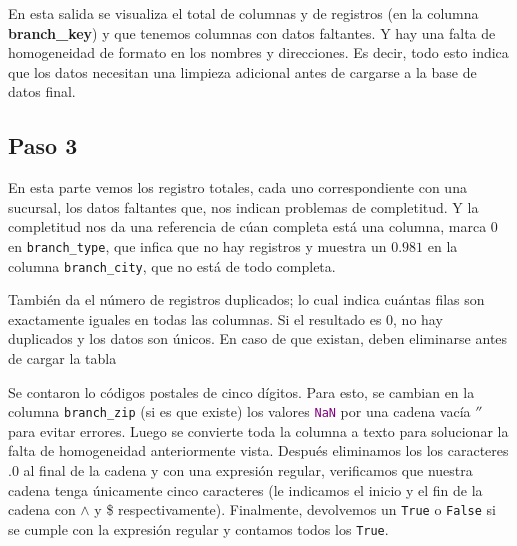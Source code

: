\vspace{0.5 cm}

En esta salida se visualiza el total de columnas y de registros 
(en la columna \textbf{branch\_key}) y que tenemos columnas con 
datos faltantes. Y hay una falta de homogeneidad de formato en los nombres 
y direcciones. Es decir, todo esto indica que los datos necesitan una 
limpieza adicional antes de cargarse a la base de datos final. 

\vspace{0.5 cm}

\subsection*{Paso 3}



\vspace{0.5 cm}

En esta parte vemos los registro totales, cada uno correspondiente con una 
sucursal, los datos faltantes que, nos indican problemas de completitud. Y 
la completitud nos da una referencia de cúan completa está una columna, 
marca $0$ en \texttt{branch\_type}, que infica que no hay registros y muestra 
un $0.981$ en la columna \texttt{branch\_city}, que no está de todo completa. 

También da el número de registros duplicados; lo cual indica cuántas filas 
son exactamente iguales en todas las columnas.
Si el resultado es 0, no hay duplicados y los datos son únicos.
En caso de que existan, deben eliminarse antes de cargar la tabla

Se contaron lo códigos postales de cinco dígitos. Para esto, se cambian en 
la columna \texttt{branch\_zip} (si es que existe) los valores 
\textcolor{purple}{\texttt{NaN}} por una cadena vacía $''$ para evitar errores. 
Luego se convierte toda la columna a texto para solucionar la falta de homogeneidad 
anteriormente vista. Después eliminamos los los caracteres $.0$ al final de la cadena 
y con una expresión regular, verificamos que nuestra cadena tenga únicamente cinco 
caracteres (le indicamos el inicio y el fin de la cadena con $\land$ y \$ respectivamente).
Finalmente, devolvemos un \texttt{True} o \texttt{False} si se cumple con la expresión 
regular y contamos todos los \texttt{True}. 

\vspace{0.5 cm}

